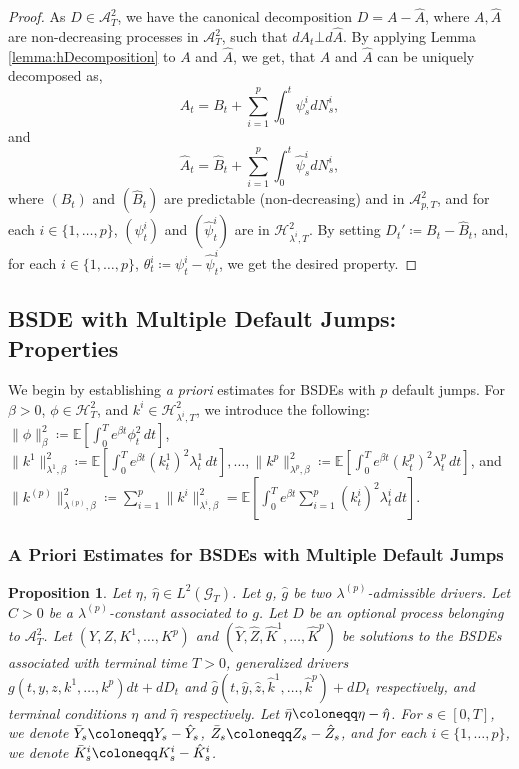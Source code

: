\documentclass[11pt,a4paper]{article}
\numberwithin{equation}{section}
\theoremstyle{newPlain}
\newtheorem{proposition}[theorem]{Proposition}
\theoremstyle{newDefinition}
\theoremstyle{newRemark}
\begin{document}
{\begin{proof}
    As $D\in\mathcal{A}_T^2$, we have the canonical decomposition $D = A - \hat{A}$, where $A,\hat{A}$ are non-decreasing processes in $\mathcal{A}_T^2$, such that $dA_t\bot d\hat{A}$. By applying Lemma \ref{lemma:hDecomposition} to $A$ and $\hat{A}$, we get, that $A$ and $\hat{A}$ can be uniquely decomposed as,
    \begin{equation*}
        A_t = B_t + \sum_{i=1}^p\int_0^t \psi_s^idN_s^i,
    \end{equation*}
    and
    \begin{equation*}
        \hat{A}_t = \hat{B}_t + \sum_{i=1}^p\int_0^t \hat{\psi}_s^idN_s^i,
    \end{equation*}
    where $(B_t)$ and $(\hat{B}_t)$ are predictable (non-decreasing) and in $\mathcal{A}_{p,T}^2$, and for each $i\in\{1,\ldots,p\}$, $(\psi_t^i)$ and $(\hat{\psi}_t^i)$ are in $\mathcal{H}_{\lambda^i,T}^2$. By setting $D_t' \coloneqq B_t -\hat{B}_t$, and, for each $i\in\{1,\ldots,p\}$, $\theta_t^i\coloneqq\psi_t^i-\hat{\psi}_t^i$, we get the desired property.
\end{proof}

\subsection{BSDE with Multiple Default Jumps: Properties}\label{subsection_existence}

We begin by establishing \emph{a priori} estimates for BSDEs with $p$ default jumps. For $\beta > 0$, $\phi \in \mathcal{H}_T^2$, and $k^i \in \mathcal{H}_{\lambda^i,T}^2$, we introduce the following: $\|\phi\|_\beta^2 \coloneqq \mathbb{E}[\int_0^T e^{\beta t} \phi_t^2 \, dt]$, $\|k^1\|_{\lambda^1,\beta}^2 \coloneqq \mathbb{E}[\int_0^T e^{\beta t} (k_t^1)^2 \lambda_t^1 \, dt], \ldots, \|k^p\|_{\lambda^p,\beta}^2 \coloneqq \mathbb{E}[\int_0^T e^{\beta t} (k_t^p)^2 \lambda_t^p \, dt]$, and $\|k^{(p)}\|_{\lambda^{(p)},\beta}^2 \coloneqq \sum_{i=1}^p \|k^i\|_{\lambda^i,\beta}^2 = \mathbb{E}[\int_0^T e^{\beta t} \sum_{i=1}^p (k_t^i)^2 \lambda_t^i \, dt]$.

\subsubsection{A Priori Estimates for BSDEs with Multiple Default Jumps}

\begin{proposition}\label{prop:PE}
    Let $\eta$, $\hat{\eta}\in L^2(\mathcal{G}_T)$. Let $g$, $\hat{g}$ be two $\lambda^{(p)}$-admissible drivers. Let $C>0$ be a $\lambda^{(p)}$-constant associated to $g$. Let $D$ be an optional process belonging to $\mathcal{A}_T^2$.
    Let $(Y,Z,K^1,\ldots,K^p)$ and $(\hat{Y}, \hat{Z}, \hat{K}^1,\ldots,\hat{K}^p)$ be  solutions to the BSDEs associated with terminal time $T>0$, generalized drivers $g(t,y,z,k^1,\ldots,k^p)dt + dD_t$ and $\hat{g}(t,\hat{y},\hat{z},\hat{k}^1,\ldots,\hat{k}^p) + dD_t$ respectively, and terminal conditions $\eta$ and $\hat{\eta}$ respectively.
    Let $\Bar{\eta}\coloneqq\eta - \hat{\eta}$.  For $s\in[0,T]$, we denote $\Bar{Y}_s\coloneqq Y_s - \hat{Y}_s$, $\Bar{Z}_s\coloneqq Z_s - \hat{Z}_s$, and for each $i\in\{1,\ldots,p\}$, we denote $\Bar{K}_s^i\coloneqq K_s^i - \hat{K}_s^i$.


\end{proposition}}
\end{document}
